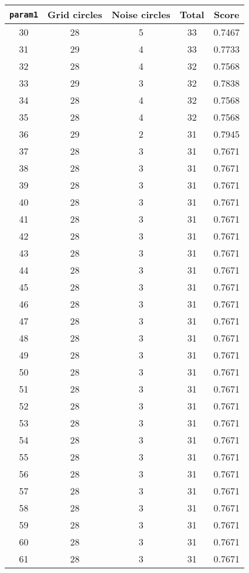 \documentclass[letterpaper, 12pt]{article}
\begin{document}
\begin{longtable}{|c|c|c|c|c|}
\hline
\textbf{\texttt{param1}} & \textbf{Grid circles} & \textbf{Noise circles} & \textbf{Total} & \textbf{Score} \\
\hline
30 & 28 & 5 & 33 & 0.7467 \\
\hline
31 & 29 & 4 & 33 & 0.7733 \\
\hline
32 & 28 & 4 & 32 & 0.7568 \\
\hline
33 & 29 & 3 & 32 & 0.7838 \\
\hline
34 & 28 & 4 & 32 & 0.7568 \\
\hline
35 & 28 & 4 & 32 & 0.7568 \\
\hline
36 & 29 & 2 & 31 & 0.7945 \\
\hline
37 & 28 & 3 & 31 & 0.7671 \\
\hline
38 & 28 & 3 & 31 & 0.7671 \\
\hline
39 & 28 & 3 & 31 & 0.7671 \\
\hline
40 & 28 & 3 & 31 & 0.7671 \\
\hline
41 & 28 & 3 & 31 & 0.7671 \\
\hline
42 & 28 & 3 & 31 & 0.7671 \\
\hline
43 & 28 & 3 & 31 & 0.7671 \\
\hline
44 & 28 & 3 & 31 & 0.7671 \\
\hline
45 & 28 & 3 & 31 & 0.7671 \\
\hline
46 & 28 & 3 & 31 & 0.7671 \\
\hline
47 & 28 & 3 & 31 & 0.7671 \\
\hline
48 & 28 & 3 & 31 & 0.7671 \\
\hline
49 & 28 & 3 & 31 & 0.7671 \\
\hline
50 & 28 & 3 & 31 & 0.7671 \\
\hline
51 & 28 & 3 & 31 & 0.7671 \\
\hline
52 & 28 & 3 & 31 & 0.7671 \\
\hline
53 & 28 & 3 & 31 & 0.7671 \\
\hline
54 & 28 & 3 & 31 & 0.7671 \\
\hline
55 & 28 & 3 & 31 & 0.7671 \\
\hline
56 & 28 & 3 & 31 & 0.7671 \\
\hline
57 & 28 & 3 & 31 & 0.7671 \\
\hline
58 & 28 & 3 & 31 & 0.7671 \\
\hline
59 & 28 & 3 & 31 & 0.7671 \\
\hline
60 & 28 & 3 & 31 & 0.7671 \\
\hline
61 & 28 & 3 & 31 & 0.7671 \\

\end{longtable}
\end{document}
